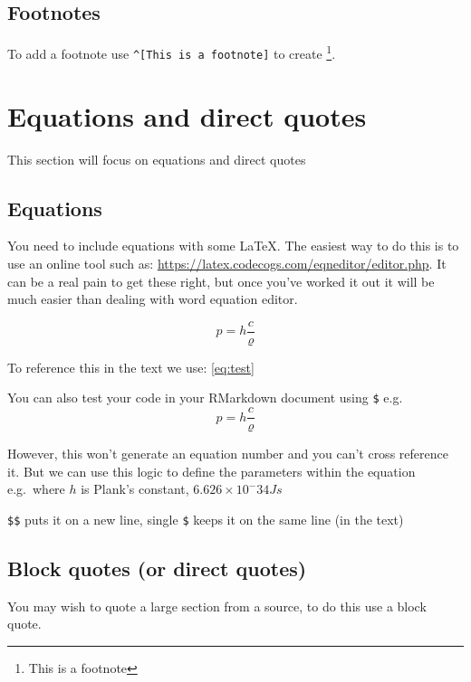 \documentclass[
  12pt,
  oneside]{book}
\begin{document}
\hypertarget{footnotes}{%
\section{Footnotes}\label{footnotes}}

To add a footnote use \texttt{\^{}{[}This\ is\ a\ footnote{]}} to create \footnote{This is a footnote}.

\hypertarget{equations-and-direct-quotes}{%
\chapter{Equations and direct quotes}\label{equations-and-direct-quotes}}

This section will focus on equations and direct quotes

\hypertarget{equations}{%
\section{Equations}\label{equations}}

You need to include equations with some LaTeX. The easiest way to do this is to use an online tool such as: \url{https://latex.codecogs.com/eqneditor/editor.php}. It can be a real pain to get these right, but once you've worked it out it will be much easier than dealing with word equation editor.

\begin{equation} 
  p= h\frac{c}{\varrho}
  \label{eq:test}
\end{equation}

To reference this in the text we use: \eqref{eq:test}

You can also test your code in your RMarkdown document using \texttt{\$} e.g.~\[p= h\frac{c}{\varrho}\]

However, this won't generate an equation number and you can't cross reference it. But we can use this logic to define the parameters within the equation e.g.~where \(h\) is Plank's constant, \(6.626 × 10^-34 Js\)

\texttt{\$\$} puts it on a new line, single \texttt{\$} keeps it on the same line (in the text)

\hypertarget{quotes}{%
\section{Block quotes (or direct quotes)}\label{quotes}}

You may wish to quote a large section from a source, to do this use a block quote.
\end{document}
